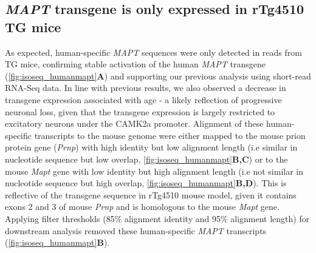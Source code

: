 \begin{figure}[p]
	\captionsetup{width=0.95\textwidth}
\end{figure}


\subsection{\textit{MAPT} transgene is only expressed in rTg4510 TG mice}
\label{mapt_transgene_whole}
As expected, human-specific \textit{MAPT} sequences were only detected in reads from TG mice, confirming stable activation of the human \textit{MAPT} transgene (\cref{fig:isoseq_humanmapt}\textbf{A}) and supporting our previous analysis using short-read RNA-Seq data\cite{Castanho2020}. In line with previous results, we also observed a decrease in transgene expression associated with age - a likely reflection of progressive neuronal loss, given that the transgene expression is largely restricted to excitatory neurons under the CAMK2a promoter. Alignment of these human-specific transcripts to the mouse genome were either mapped to the mouse prion protein gene (\textit{Prnp}) with high identity but low alignment length (i.e similar in nucleotide sequence but low overlap, \cref{fig:isoseq_humanmapt}\textbf{B,C}) or to the mouse \textit{Mapt} gene with low identity but high alignment length (i.e not similar in nucleotide sequence but high overlap, \cref{fig:isoseq_humanmapt}\textbf{B,D}). This is reflective of the transgene sequence in rTg4510 mouse model, given it contains exons 2 and 3 of mouse \textit{Prnp}\cite{Ramsden2005} and is homologous to the mouse \textit{Mapt} gene. Applying filter thresholds (85\% alignment identity and 95\% alignment length) for downstream analysis removed these human-specific \textit{MAPT} transcripts (\cref{fig:isoseq_humanmapt}\textbf{B}). 

